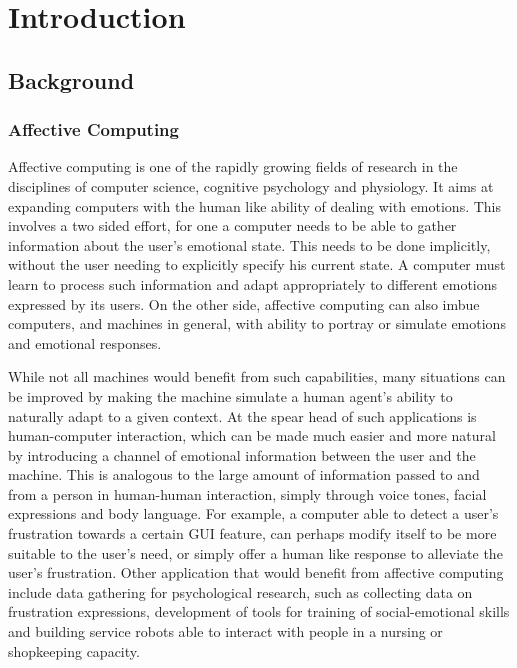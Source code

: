\documentclass[12pt, a4paper, fleqn]{memoir}%
\begin{document}
\cleardoublepage
\rmfamily
\normalfont
{}
\pagestyle{headings}
\tableofcontents


\mainmatter

\chapter{Introduction}
\label{chap:Introduction}

\section{Background}
\subsection{Affective Computing}
Affective computing is one of the rapidly growing fields of research in the disciplines of computer science, cognitive psychology and physiology\cite{tao2005affective}. It aims at expanding computers with the human like ability of dealing with emotions. This involves a two sided effort, for one a computer needs to be able to gather information about the user's emotional state. This needs to be done implicitly, without the user needing to explicitly specify his current state. A computer must learn to process such information and adapt appropriately to different emotions expressed by its users. On the other side, affective computing can also imbue computers, and machines in general, with ability to portray or simulate emotions and emotional responses\cite{picard2003affective, picard1999affective}. 

While not all machines would benefit from such capabilities, many situations can be improved by making the machine simulate a human agent's ability to naturally adapt to a given context\cite{picard1999affective}. At the spear head of such applications is human-computer interaction, which can be made much easier and more natural by introducing a  channel of emotional information between the user and the machine. This is analogous to the large amount of information passed to and from a person in human-human interaction, simply through voice tones, facial expressions and body language\cite{cowie2001emotion}. For example, a computer able to detect a user's frustration towards a certain GUI feature, can perhaps modify itself to be more suitable to the user's need, or simply offer a human like response to alleviate the user's frustration. Other application that would benefit from affective computing include data gathering for psychological research, such as collecting data on frustration expressions, development of tools for training of social-emotional skills and building service robots able to interact with people in a nursing or shopkeeping capacity\cite{picard1999affective}.
\end{document}
